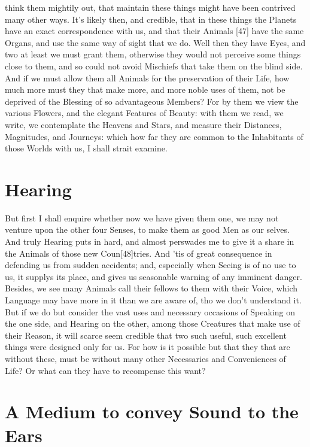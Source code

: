 \documentclass[letterpaper]{book}
\begin{document}
think them mightily out, that maintain these things might have been
contrived many other ways.  It's likely then, and credible, that in these
things the Planets have an exact correspondence with us, and that their
Animals [47] have the same Organs, and use the same way of sight that we do.
Well then they have Eyes, and two at least we must grant them, otherwise
they would not perceive some things close to them, and so could not avoid
Mischiefs that take them on the blind side. And if we must allow them all
Animals for the preservation of their Life, how much more must they that
make more, and more noble uses of them, not be deprived of the Blessing of
so advantageous Members? For by them we view the various Flowers, and the
elegant Features of Beauty: with them we read, we write, we contemplate the
Heavens and Stars, and measure their Distances, Magnitudes, and Journeys:
which how far they are common to the Inhabitants of those Worlds with us, I
shall strait examine.


\section{Hearing}

But first I shall enquire whether now we have given them one, we may not
venture upon the other four Senses, to make them as good Men as our selves.
And truly Hearing puts in hard, and almost perswades me to give it a share
in the Animals of those new Coun[48]tries. And 'tis of great consequence in
defending us from sudden accidents; and, especially when Seeing is of no use
to us, it supplys its place, and gives us seasonable warning of any imminent
danger. Besides, we see many Animals call their fellows to them with their
Voice, which Language may have more in it than we are aware of, tho we
don't understand it. But if we do but consider the vast uses and necessary
occasions of Speaking on the one side, and Hearing on the other, among
those Creatures that make use of their Reason, it will scarce seem credible
that two such useful, such excellent things were designed only for us. For
how is it possible but that they that are without these, must be without
many other Necessaries and Conveniences of Life? Or what can they have
to recompense this want?


\section{A Medium to convey Sound to the Ears}
\end{document}

